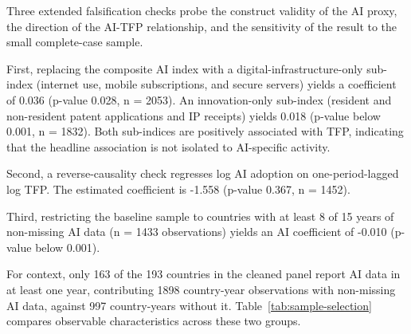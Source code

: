 Three extended falsification checks probe the construct validity of the AI proxy, the direction of the AI-TFP relationship, and the sensitivity of the result to the small complete-case sample.

First, replacing the composite AI index with a digital-infrastructure-only sub-index (internet use, mobile subscriptions, and secure servers) yields a coefficient of 0.036 (p-value 0.028, n = 2053). An innovation-only sub-index (resident and non-resident patent applications and IP receipts) yields 0.018 (p-value below 0.001, n = 1832). Both sub-indices are positively associated with TFP, indicating that the headline association is not isolated to AI-specific activity.

Second, a reverse-causality check regresses log AI adoption on one-period-lagged log TFP. The estimated coefficient is -1.558 (p-value 0.367, n = 1452).

Third, restricting the baseline sample to countries with at least 8 of 15 years of non-missing AI data (n = 1433 observations) yields an AI coefficient of -0.010 (p-value below 0.001).

For context, only 163 of the 193 countries in the cleaned panel report AI data in at least one year, contributing 1898 country-year observations with non-missing AI data, against 997 country-years without it. Table~\ref{tab:sample-selection} compares observable characteristics across these two groups.